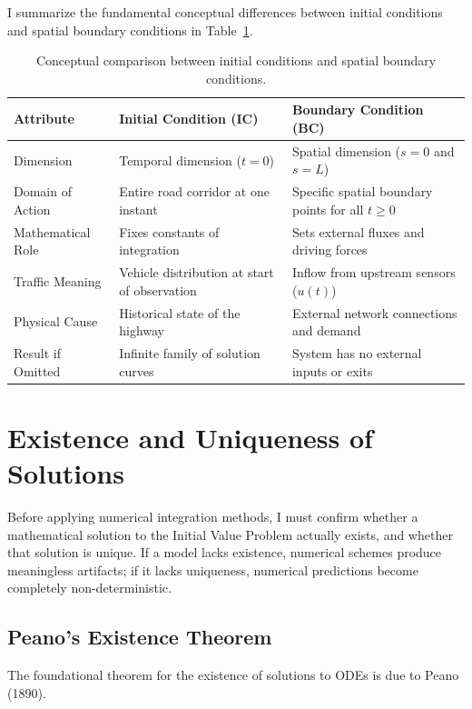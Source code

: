 \documentclass[runningheads]{llncs}
\begin{document}
I summarize the fundamental conceptual differences between initial conditions and spatial boundary conditions in Table~\ref{tab:ic_vs_bc}.

\begin{table}[htbp]
\centering
\caption{Conceptual comparison between initial conditions and spatial boundary conditions.}
\label{tab:ic_vs_bc}
\small
\setlength{\tabcolsep}{6pt}
\begin{tabular}{lll}
\toprule
\textbf{Attribute} & \textbf{Initial Condition (IC)} & \textbf{Boundary Condition (BC)} \\
\midrule
Dimension & Temporal dimension ($t = 0$) & Spatial dimension ($s = 0$ and $s = L$) \\
Domain of Action & Entire road corridor at one instant & Specific spatial boundary points for all $t \ge 0$ \\
Mathematical Role & Fixes constants of integration & Sets external fluxes and driving forces \\
Traffic Meaning & Vehicle distribution at start of observation & Inflow from upstream sensors ($u(t)$) \\
Physical Cause & Historical state of the highway & External network connections and demand \\
Result if Omitted & Infinite family of solution curves & System has no external inputs or exits \\
\bottomrule
\end{tabular}
\end{table}

\section{Existence and Uniqueness of Solutions}
\label{sec:existence}
Before applying numerical integration methods, I must confirm whether a mathematical solution to the Initial Value Problem actually exists, and whether that solution is unique. If a model lacks existence, numerical schemes produce meaningless artifacts; if it lacks uniqueness, numerical predictions become completely non-deterministic.

\subsection{Peano's Existence Theorem}
The foundational theorem for the existence of solutions to ODEs is due to Peano (1890).
\end{document}
